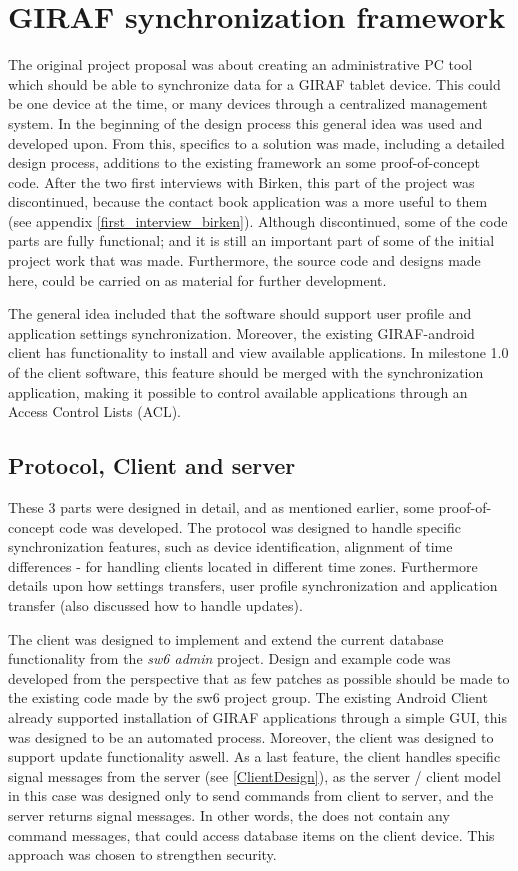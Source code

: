 \section{GIRAF synchronization framework}
The original project proposal was about creating an administrative PC tool which should be able to synchronize data for a GIRAF tablet device. This could be one device at the time, or many devices through a centralized management system. In the beginning of the design process this general idea was used and developed upon. From this, specifics to a solution was made, including a detailed design process, additions to the existing framework an some proof-of-concept code. After the two first interviews with Birken, this part of the project was discontinued, because the contact book application was a more useful to them (see appendix \vref{first_interview_birken}). Although discontinued, some of the code parts are fully functional; and it is still an important part of some of the initial project work that was made. Furthermore, the source code and designs made here, could be carried on as material for further development. 

The general idea included that the software should support user profile and application settings synchronization. Moreover, the existing GIRAF-android client has functionality to install and view available applications. In milestone 1.0 of the client software, this feature should be merged with the synchronization application, making it possible to control available applications through an Access Control Lists (ACL).

\subsection{Protocol, Client and server}
These 3 parts were designed in detail, and as mentioned earlier, some proof-of-concept code was developed. The protocol was designed to handle specific synchronization features, such as device identification, alignment of time differences - for handling clients located in different time zones. Furthermore details upon how settings transfers, user profile synchronization and application transfer (also discussed how to handle updates).  

The client was designed to implement and extend the current database functionality from the \emph{sw6 admin} project. Design and example code was developed from the perspective that as few patches as possible should be made to the existing code made by the sw6 project group.
The existing Android Client already supported installation of GIRAF applications through a simple GUI, this  was designed to be an automated process. Moreover, the client was designed to support update functionality aswell. As a last feature, the client handles specific signal messages from the server (see \vref{ClientDesign}), as the server / client model in this case was designed only to send commands from client to server, and the server returns signal messages. In other words, the does not contain any command messages, that could access database items on the client device. This approach was chosen to strengthen security.  

